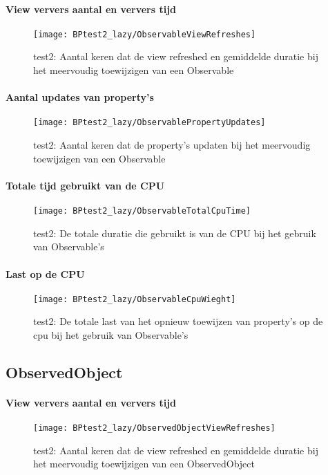 \paragraph{View ververs aantal en ververs tijd}
\begin{figure}[H]
    \centering
    \texttt{[image: BPtest2\_lazy/ObservableViewRefreshes]} 
    \caption{test2: Aantal keren dat de view refreshed en gemiddelde duratie bij het meervoudig toewijzigen van een Observable}
    \label{fig:viewRefreshesObservable2}
\end{figure}
\paragraph{Aantal updates van property's}
\begin{figure}[H]
    \centering
    \texttt{[image: BPtest2\_lazy/ObservablePropertyUpdates]} 
    \caption{test2: Aantal keren dat de property's updaten bij het meervoudig toewijzigen van een Observable}
    \label{fig:propertyUpdatesObservable2}
\end{figure}
\paragraph{Totale tijd gebruikt van de CPU}
\begin{figure}[H]
    \centering
    \texttt{[image: BPtest2\_lazy/ObservableTotalCpuTime]} 
    \caption{test2: De totale duratie die gebruikt is van de CPU bij het gebruik van Observable's}
    \label{fig:cpuUsageTimeObservable2}
\end{figure}
\paragraph{Last op de CPU}
\begin{figure}[H]
    \centering
    \texttt{[image: BPtest2\_lazy/ObservableCpuWieght]} 
    \caption{test2: De totale last van het opnieuw toewijzen van property's op de cpu bij het gebruik van Observable's}
    \label{fig:cpuWeightObservable2}
\end{figure}

\subsection{ObservedObject}
\paragraph{View ververs aantal en ververs tijd}
\begin{figure}[H]
    \centering
    \texttt{[image: BPtest2\_lazy/ObservedObjectViewRefreshes]} 
    \caption{test2: Aantal keren dat de view refreshed en gemiddelde duratie bij het meervoudig toewijzigen van een ObservedObject}
    \label{fig:viewRefreshesObservedObject2}
\end{figure}
